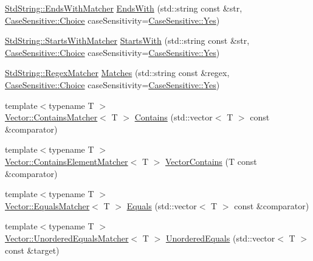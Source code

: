 \begin{DoxyCompactItemize}
\item 
\mbox{\hyperlink{struct_catch_1_1_matchers_1_1_std_string_1_1_ends_with_matcher}{Std\+String\+::\+Ends\+With\+Matcher}} \mbox{\hyperlink{namespace_catch_1_1_matchers_ae5a45efb4538c57c43e04f3f9043ad6e}{Ends\+With}} (std\+::string const \&str, \mbox{\hyperlink{struct_catch_1_1_case_sensitive_aad49d3aee2d97066642fffa919685c6a}{Case\+Sensitive\+::\+Choice}} case\+Sensitivity=\mbox{\hyperlink{struct_catch_1_1_case_sensitive_aad49d3aee2d97066642fffa919685c6aa7c5550b69ec3c502e6f609b67f9613c6}{Case\+Sensitive\+::\+Yes}})
\item 
\mbox{\hyperlink{struct_catch_1_1_matchers_1_1_std_string_1_1_starts_with_matcher}{Std\+String\+::\+Starts\+With\+Matcher}} \mbox{\hyperlink{namespace_catch_1_1_matchers_a97c9ee09a70378ca7e8c6f9f01b0d6d1}{Starts\+With}} (std\+::string const \&str, \mbox{\hyperlink{struct_catch_1_1_case_sensitive_aad49d3aee2d97066642fffa919685c6a}{Case\+Sensitive\+::\+Choice}} case\+Sensitivity=\mbox{\hyperlink{struct_catch_1_1_case_sensitive_aad49d3aee2d97066642fffa919685c6aa7c5550b69ec3c502e6f609b67f9613c6}{Case\+Sensitive\+::\+Yes}})
\item 
\mbox{\hyperlink{struct_catch_1_1_matchers_1_1_std_string_1_1_regex_matcher}{Std\+String\+::\+Regex\+Matcher}} \mbox{\hyperlink{namespace_catch_1_1_matchers_a82f1893cf50ae4c14b9b3e0980bf22b8}{Matches}} (std\+::string const \&regex, \mbox{\hyperlink{struct_catch_1_1_case_sensitive_aad49d3aee2d97066642fffa919685c6a}{Case\+Sensitive\+::\+Choice}} case\+Sensitivity=\mbox{\hyperlink{struct_catch_1_1_case_sensitive_aad49d3aee2d97066642fffa919685c6aa7c5550b69ec3c502e6f609b67f9613c6}{Case\+Sensitive\+::\+Yes}})
\item 
{\footnotesize template$<$typename T $>$ }\\\mbox{\hyperlink{struct_catch_1_1_matchers_1_1_vector_1_1_contains_matcher}{Vector\+::\+Contains\+Matcher}}$<$ T $>$ \mbox{\hyperlink{namespace_catch_1_1_matchers_a4b3621740dc515216ad31ab827d4092c}{Contains}} (std\+::vector$<$ T $>$ const \&comparator)
\item 
{\footnotesize template$<$typename T $>$ }\\\mbox{\hyperlink{struct_catch_1_1_matchers_1_1_vector_1_1_contains_element_matcher}{Vector\+::\+Contains\+Element\+Matcher}}$<$ T $>$ \mbox{\hyperlink{namespace_catch_1_1_matchers_ae8db5846328116fb36386893deaec944}{Vector\+Contains}} (T const \&comparator)
\item 
{\footnotesize template$<$typename T $>$ }\\\mbox{\hyperlink{struct_catch_1_1_matchers_1_1_vector_1_1_equals_matcher}{Vector\+::\+Equals\+Matcher}}$<$ T $>$ \mbox{\hyperlink{namespace_catch_1_1_matchers_a332a401fb0da33c988e9cfa400ecce1b}{Equals}} (std\+::vector$<$ T $>$ const \&comparator)
\item 
{\footnotesize template$<$typename T $>$ }\\\mbox{\hyperlink{struct_catch_1_1_matchers_1_1_vector_1_1_unordered_equals_matcher}{Vector\+::\+Unordered\+Equals\+Matcher}}$<$ T $>$ \mbox{\hyperlink{namespace_catch_1_1_matchers_a3eced3a4f580478f4c5e67ed7e2915df}{Unordered\+Equals}} (std\+::vector$<$ T $>$ const \&target)
\end{DoxyCompactItemize}



